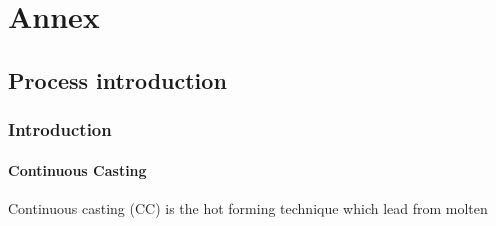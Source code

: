 \newpage
\pagestyle{fancy}


\appendix
\chapter{Annex}
\section{Process introduction}
\subsection{Introduction}
\subsubsection{Continuous Casting}
Continuous casting (CC) is the hot forming technique which lead from molten 
